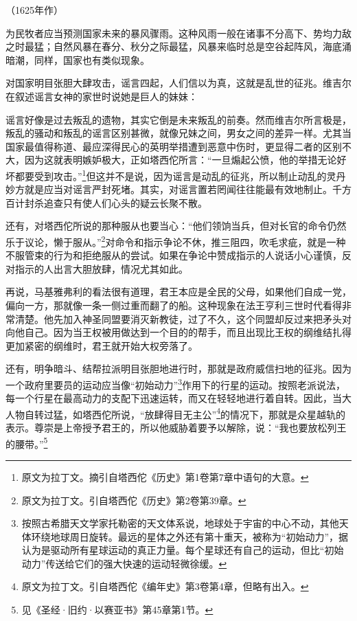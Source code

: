\begin{center}
    （1625年作）
\end{center}
\par 为民牧者应当预测国家未来的暴风骤雨。这种风雨一般在诸事不分高下、势均力敌之时最猛；自然风暴在春分、秋分之际最猛，风暴来临时总是空谷起阵风，海底涌暗潮，同样，国家也有类似现象。
\par 对国家明目张胆大肆攻击，谣言四起，人们信以为真，这就是乱世的征兆。维吉尔在叙述谣言女神的家世时说她是巨人的妹妹：
\par 谣言好像是过去叛乱的遗物，其实它倒是未来叛乱的前奏。然而维吉尔所言极是，叛乱的骚动和叛乱的谣言区别甚微，就像兄妹之间，男女之间的差异一样。尤其当国家最值得称道、最应深得民心的英明举措遭到恶意中伤时，更显得二者的区别不大，因为这就表明嫉妒极大，正如塔西佗所言：“一旦煽起公愤，他的举措无论好坏都要受到攻击。”\footnote{原文为拉丁文。摘引自塔西佗《历史》第1卷第7章中语句的大意。}但这并不是说，因为谣言是动乱的征兆，所以制止动乱的灵丹妙方就是应当对谣言严封死堵。其实，对谣言置若罔闻往往能最有效地制止。千方百计封杀追查只有使人们心头的疑云长聚不散。
\par 还有，对塔西佗所说的那种服从也要当心：“他们领饷当兵，但对长官的命令仍然乐于议论，懒于服从。”\footnote{原文为拉丁文。引自塔西佗《历史》第2卷第39章。}对命令和指示争论不休，推三阻四，吹毛求疵，就是一种不服管束的行为和拒绝服从的尝试。如果在争论中赞成指示的人说话小心谨慎，反对指示的人出言大胆放肆，情况尤其如此。
\par 再说，马基雅弗利的看法很有道理，君王本应是全民的父母，如果他们自成一党，偏向一方，那就像一条一侧过重而翻了的船。这种现象在法王亨利三世时代看得非常清楚。他先加入神圣同盟要消灭新教徒，过了不久，这个同盟却反过来把矛头对向他自己。因为当王权被用做达到一个目的的帮手，而且出现比王权的纲维结扎得更加紧密的纲维时，君王就开始大权旁落了。
\par 还有，明争暗斗、结帮拉派明目张胆地进行时，那就是政府威信扫地的征兆。因为一个政府里要员的运动应当像“初始动力”\footnote{按照古希腊天文学家托勒密的天文体系说，地球处于宇宙的中心不动，其他天体环绕地球周日旋转。最远的星体之外还有第十重天，被称为“初始动力”，据认为是驱动所有星球运动的真正力量。每个星球还有自己的运动，但比“初始动力”传送给它们的强大快速的运动轻微徐缓。}作用下的行星的运动。按照老派说法，每一个行星在最高动力的支配下迅速运转，而又在轻轻地进行着自转。因此，当大人物自转过猛，如塔西佗所说，“放肆得目无主公”\footnote{原文为拉丁文。引自塔西佗《编年史》第3卷第4章，但略有出入。}的情况下，那就是众星越轨的表示。尊崇是上帝授予君王的，所以他威胁着要予以解除，说：“我也要放松列王的腰带。”\footnote{见《圣经·旧约·以赛亚书》第45章第1节。}
